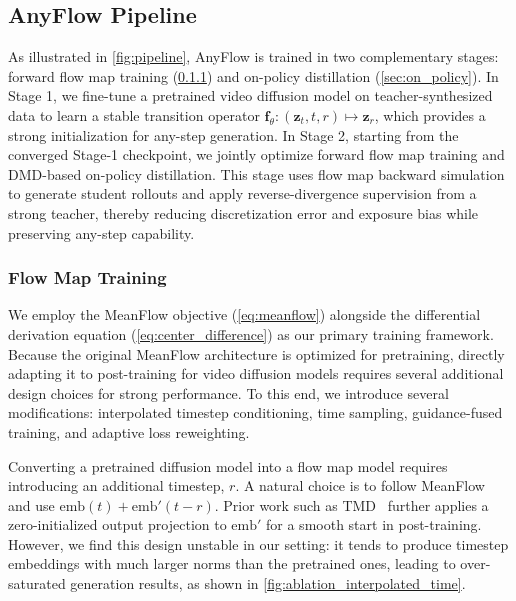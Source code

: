 


\subsection{AnyFlow Pipeline}
\label{sec:pipeline}

 As illustrated in \cref{fig:pipeline}, AnyFlow is trained in two complementary stages: forward flow map training (\cref{sec:flow_map}) and on-policy distillation (\cref{sec:on_policy}). In Stage 1, we fine-tune a pretrained video diffusion model on teacher-synthesized data to learn a stable transition operator $\mathbf{f}_\theta:(\mathbf{z}_t, t, r) \mapsto \mathbf{z}_r$, which provides a strong initialization for any-step generation. In Stage 2, starting from the converged Stage-1 checkpoint, we jointly optimize forward flow map training and DMD-based on-policy distillation. This stage uses flow map backward simulation to generate student rollouts and apply reverse-divergence supervision from a strong teacher, thereby reducing discretization error and exposure bias while preserving any-step capability.


\subsubsection{Flow Map Training}
\label{sec:flow_map}

\noindent We employ the MeanFlow objective (\cref{eq:meanflow}) alongside the differential derivation equation (\cref{eq:center_difference}) as our primary training framework. Because the original MeanFlow architecture is optimized for pretraining, directly adapting it to post-training for video diffusion models requires several additional design choices for strong performance. To this end, we introduce several modifications: interpolated timestep conditioning, time sampling, guidance-fused training, and adaptive loss reweighting.




 Converting a pretrained diffusion model into a flow map model requires introducing an additional timestep, $r$. A natural choice is to follow MeanFlow~\cite{geng2025mean} and use $\text{emb}(t) + \text{emb}'(t-r)$. Prior work such as TMD~\cite{nie2026transition} further applies a zero-initialized output projection to $\text{emb}'$ for a smooth start in post-training. However, we find this design unstable in our setting: it tends to produce timestep embeddings with much larger norms than the pretrained ones, leading to over-saturated generation results, as shown in \cref{fig:ablation_interpolated_time}.

